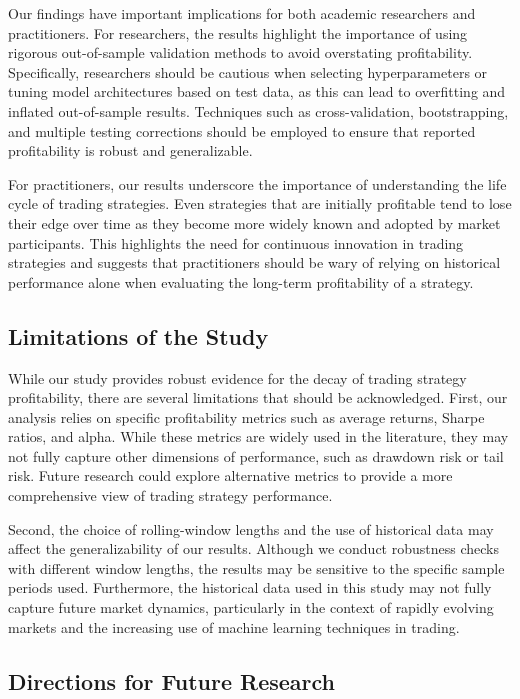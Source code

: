 Our findings have important implications for both academic researchers and practitioners. For researchers, the results highlight the importance of using rigorous out-of-sample validation methods to avoid overstating profitability. Specifically, researchers should be cautious when selecting hyperparameters or tuning model architectures based on test data, as this can lead to overfitting and inflated out-of-sample results. Techniques such as cross-validation, bootstrapping, and multiple testing corrections should be employed to ensure that reported profitability is robust and generalizable.

For practitioners, our results underscore the importance of understanding the life cycle of trading strategies. Even strategies that are initially profitable tend to lose their edge over time as they become more widely known and adopted by market participants. This highlights the need for continuous innovation in trading strategies and suggests that practitioners should be wary of relying on historical performance alone when evaluating the long-term profitability of a strategy.

\subsection{Limitations of the Study}

While our study provides robust evidence for the decay of trading strategy profitability, there are several limitations that should be acknowledged. First, our analysis relies on specific profitability metrics such as average returns, Sharpe ratios, and alpha. While these metrics are widely used in the literature, they may not fully capture other dimensions of performance, such as drawdown risk or tail risk. Future research could explore alternative metrics to provide a more comprehensive view of trading strategy performance.

Second, the choice of rolling-window lengths and the use of historical data may affect the generalizability of our results. Although we conduct robustness checks with different window lengths, the results may be sensitive to the specific sample periods used. Furthermore, the historical data used in this study may not fully capture future market dynamics, particularly in the context of rapidly evolving markets and the increasing use of machine learning techniques in trading.

\subsection{Directions for Future Research}


